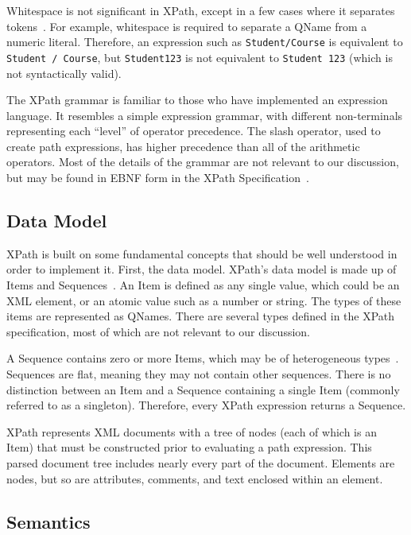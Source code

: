 \documentclass{scrartcl}
\begin{document}
Whitespace is not significant in XPath, except in a few cases where it separates
tokens~\cite{xpath}. For example, whitespace is required to separate a QName
from a numeric literal. Therefore, an expression such as \texttt{Student/Course}
is equivalent to \texttt{Student / Course}, but \texttt{Student123} is not
equivalent to \texttt{Student 123} (which is not syntactically valid).

The XPath grammar is familiar to those who have implemented an expression
language. It resembles a simple expression grammar, with different non-terminals
representing each ``level'' of operator precedence. The slash operator, used to
create path expressions, has higher precedence than all of the arithmetic
operators. Most of the details of the grammar are not relevant to our
discussion, but may be found in EBNF form in the XPath
Specification~\cite{xpath}.

\subsection{Data Model}

XPath is built on some fundamental concepts that should be well understood in
order to implement it. First, the data model. XPath's data model is made up of
Items and Sequences~\cite{xpath-datamodel}. An Item is defined as any single
value, which could be an XML element, or an atomic value such as a number or
string. The types of these items are represented as QNames. There are several
types defined in the XPath specification, most of which are not relevant to our
discussion.

A Sequence contains zero or more Items, which may be of heterogeneous
types~\cite{xpath-datamodel}. Sequences are flat, meaning they may not contain
other sequences. There is no distinction between an Item and a Sequence
containing a single Item (commonly referred to as a singleton). Therefore, every
XPath expression returns a Sequence.

XPath represents XML documents with a tree of nodes (each of which is an Item)
that must be constructed prior to evaluating a path expression. This parsed
document tree includes nearly every part of the document. Elements are nodes,
but so are attributes, comments, and text enclosed within an element.

\subsection{Semantics}
\end{document}
